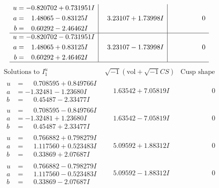 \documentclass[1p]{elsarticle_modified}
\theoremstyle{definition}
\newcommand{\I}{\sqrt{-1}}
\begin{document}
$$\begin{array}{c|c|c}
\begin{aligned}
u &= -0.820702 + 0.731951 I \\
a &= \phantom{-}1.48065 - 0.83125 I \\
b &= \phantom{-}0.60292 - 2.46462 I\end{aligned}
 & \phantom{-}3.23107 + 1.73998 I & \phantom{-0.000000 } 0 \\ \hline\begin{aligned}
u &= -0.820702 - 0.731951 I \\
a &= \phantom{-}1.48065 + 0.83125 I \\
b &= \phantom{-}0.60292 + 2.46462 I\end{aligned}
 & \phantom{-}3.23107 - 1.73998 I & \phantom{-0.000000 } 0\\
 \hline 
 \end{array}$$\newpage$$\begin{array}{c|c|c}  
\text{Solutions to }I^u_{1}& \I (\text{vol} + \sqrt{-1}CS) & \text{Cusp shape}\\
 \hline 
\begin{aligned}
u &= \phantom{-}0.708595 + 0.849766 I \\
a &= -1.32481 - 1.23680 I \\
b &= \phantom{-}0.45487 - 2.33477 I\end{aligned}
 & \phantom{-}1.63542 + 7.05819 I & \phantom{-0.000000 } 0 \\ \hline\begin{aligned}
u &= \phantom{-}0.708595 - 0.849766 I \\
a &= -1.32481 + 1.23680 I \\
b &= \phantom{-}0.45487 + 2.33477 I\end{aligned}
 & \phantom{-}1.63542 - 7.05819 I & \phantom{-0.000000 } 0 \\ \hline\begin{aligned}
u &= \phantom{-}0.766882 + 0.798279 I \\
a &= \phantom{-}1.117560 + 0.523483 I \\
b &= \phantom{-}0.33869 + 2.07687 I\end{aligned}
 & \phantom{-}5.09592 + 1.88312 I & \phantom{-0.000000 } 0 \\ \hline\begin{aligned}
u &= \phantom{-}0.766882 - 0.798279 I \\
a &= \phantom{-}1.117560 - 0.523483 I \\
b &= \phantom{-}0.33869 - 2.07687 I\end{aligned}
 & \phantom{-}5.09592 - 1.88312 I & \phantom{-0.000000 } 0 \\ \hline\begin{aligned}

\end{aligned}
\end{array}$$
\end{document}
